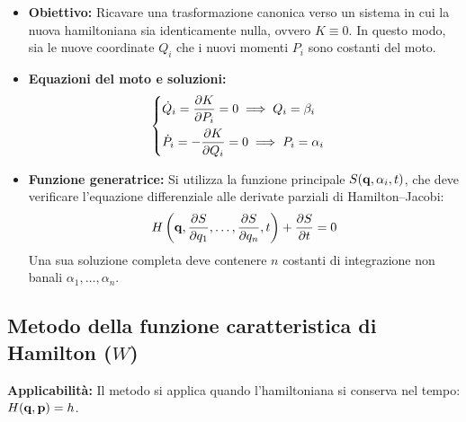 \begin{itemize}
    \item \textbf{Obiettivo:} Ricavare una trasformazione canonica verso un sistema in cui la nuova hamiltoniana sia identicamente nulla, ovvero $K \equiv 0$. In questo modo, sia le nuove coordinate $Q_i$ che i nuovi momenti $P_i$ sono costanti del moto.
    \item \textbf{Equazioni del moto e soluzioni:}
    \begin{equation*}
        \begin{cases} 
            \displaystyle \dot{Q}_i = \pdv{K}{P_i} = 0 \implies Q_i = \beta_i \\[0.3cm] 
            \displaystyle  \dot{P}_i = -\pdv{K}{Q_i} = 0 \implies P_i = \alpha_i 
        \end{cases}
    \end{equation*}
    \item \textbf{Funzione generatrice:} Si utilizza la funzione principale $S(\vb{q}, \alpha_i, t)$, che deve verificare l'equazione differenziale alle derivate parziali di Hamilton--Jacobi:
    \begin{equation*}
        H\left( \vb{q}, \pdv{S}{q_1}, \dots, \pdv{S}{q_n}, t \right) + \pdv{S}{t} = 0
    \end{equation*}
    Una sua soluzione completa deve contenere $n$ costanti di integrazione non banali $\alpha_1, \dots, \alpha_n$.
\end{itemize}

\subsection{Metodo della funzione caratteristica di Hamilton (\texorpdfstring{$W$}{W})}
\textbf{Applicabilità:} Il metodo si applica quando l'hamiltoniana si conserva nel tempo: $H(\vb{q}, \vb{p}) = h$.

